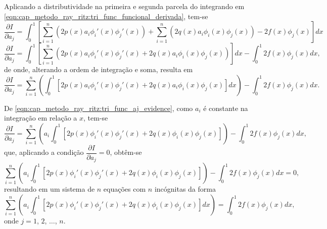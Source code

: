 \documentclass[
	12pt,				%
	openright,			%
    twoside,			%
	a4paper,			%
	chapter=TITLE,		%
	english,			%
	french,				%
	spanish,			%
	brazil				%
	]{abntex2}
\numberwithin{lema}{chapter}
\numberwithin{teorema}{chapter}
\numberwithin{definicao}{chapter}
\numberwithin{exemplo}{chapter}
\numberwithin{figure}{chapter}
\begin{document}
Aplicando a distributividade na primeira e segunda parcela do integrando em \eqref{eqn:cap_metodo_ray_ritz:tri_func_funcional_derivada}, tem-se
$$
	\frac{\partial I}{\partial a_j} = \int_0^1 \left [
		\sum_{i=1}^n \left ( 2p(x)a_i \phi_i'(x)\phi_j'(x) \right)
		+
		\sum_{i=1}^n \left ( 2q(x)a_i\phi_i(x)\phi_j(x) \right)
		- 2f(x)\phi_j(x)
	\right ] dx
$$
$$
	\frac{\partial I}{\partial a_j} = \int_0^1 \left [
		\sum_{i=1}^n \left (
			2p(x)a_i \phi_i'(x)\phi_j'(x)
			+
			2q(x)a_i\phi_i(x)\phi_j(x)
		\right )
	\right ] dx
	- \int_0^1 2f(x)\phi_j(x)dx
	\text{,}
$$
de onde, alterando a ordem de integração e soma, resulta em
\begin{equation}
	\label{eqn:cap_metodo_ray_ritz:tri_func_aj_evidence}
	\frac{\partial I}{\partial a_j} = \sum_{i=1}^n \left (
		\int_0^1 \left [
			2p(x)a_i\phi_i'(x)\phi_j'(x)
			+
			2q(x)a_i\phi_i(x)\phi_j(x)
		\right ] dx
	\right )
	- \int_0^1 2f(x)\phi_j(x)dx
	\text{.}
\end{equation}

De \eqref{eqn:cap_metodo_ray_ritz:tri_func_aj_evidence}, como $a_i$ é constante na integração em relação a $x$, tem-se
$$
	\frac{\partial I}{\partial a_j} = \sum_{i=1}^{n} \left (
		a_i \int_{0}^{1} \left [
			2p(x)\phi_i'(x)\phi_j'(x)
			+
			2q(x)\phi_i(x)\phi_j(x)
		\right ]
	\right )
	-
	\int_{0}^{1} 2f(x)\phi_j(x)dx
	\text{,}
$$
que, aplicando a condição $\dfrac{\partial I}{\partial a_j}=0$, obtêm-se
$$
	\sum_{i=1}^{n} \left (
		a_i \int_{0}^{1} \left [
			2p(x)\phi_i'(x)\phi_j'(x)
			+
			2q(x)\phi_i(x)\phi_j(x)
		\right ]
	\right )
	-
	\int_{0}^{1} 2f(x)\phi_j(x)dx
	= 0
	\text{,}
$$
resultando em um sistema de $n$ equações com $n$ incógnitas da forma
\begin{equation}
	\label{eqn:cap_metodo_ray_ritz:tri_func_sistema}
	\sum_{i=1}^{n} \left (
		a_i \int_{0}^{1} \left [
			2p(x)\phi_i'(x)\phi_j'(x)
			+
			2q(x)\phi_i(x)\phi_j(x)
		\right ] dx
	\right )
	=
	\int_{0}^{1} 2f(x)\phi_j(x)dx
	\text{,}
\end{equation}
onde $j=1$, $2$, $\dots$, $n$.
\end{document}
